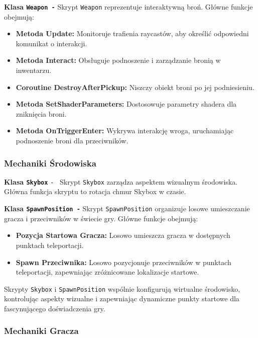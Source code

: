 \textbf{Klasa \texttt{Weapon -}}
Skrypt \texttt{Weapon} reprezentuje interaktywną broń. Główne funkcje obejmują:
\begin{itemize}
  \item \textbf{Metoda Update:} Monitoruje trafienia raycastów, aby określić odpowiedni komunikat o interakcji.
  \item \textbf{Metoda Interact:} Obsługuje podnoszenie i zarządzanie bronią w inwentarzu.
  \item \textbf{Coroutine DestroyAfterPickup:} Niszczy obiekt broni po jej podniesieniu.
  \item \textbf{Metoda SetShaderParameters:} Dostosowuje parametry shadera dla zniknięcia broni.
  \item \textbf{Metoda OnTriggerEnter:} Wykrywa interakcję wroga, uruchamiając podnoszenie broni dla przeciwników.
\end{itemize}

\subsubsection{Mechaniki Środowiska}

\textbf{Klasa \texttt{Skybox}} \label{subsubsec:skybox}
\texttt{- } Skrypt \texttt{Skybox} zarządza aspektem wizualnym środowiska. Główna funkcja skryptu to rotacja chmur Skybox w czasie.

\textbf{Klasa \texttt{SpawnPosition -}}
Skrypt \texttt{SpawnPosition} organizuje losowe umieszczanie gracza i przeciwników w świecie gry. Główne funkcje obejmują:
\begin{itemize}
  \item \textbf{Pozycja Startowa Gracza:} Losowo umieszcza gracza w dostępnych punktach teleportacji.
  \item \textbf{Spawn Przeciwnika:} Losowo pozycjonuje przeciwników w punktach teleportacji, zapewniając zróżnicowane lokalizacje startowe.
\end{itemize}

Skrypty \texttt{Skybox} i \texttt{SpawnPosition} wspólnie konfigurują wirtualne środowisko, kontrolując aspekty wizualne i zapewniając dynamiczne punkty startowe dla fascynującego doświadczenia gry.

\subsubsection{Mechaniki Gracza}

